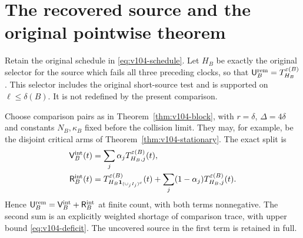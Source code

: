 \section{The recovered source and the original pointwise theorem}
\label{sec:v104-scalar}
Retain the original schedule in \eqref{eq:v104-schedule}. Let
$H_B$ be exactly the original selector for the source which fails
all three preceding clocks, so that
$\mathsf U_B^{\rm rem}=T_{H_B}^{\varepsilon(B)}$. This selector
includes the original short-source test and is supported on
$\ell\le\delta(B)$. It is not redefined by the present comparison.

Choose comparison pairs as in Theorem~\ref{thm:v104-block}, with
$r=\delta$, $\Delta=4\delta$ and constants $N_B,\kappa_B$ fixed
before the collision limit. They may, for example, be the disjoint
critical arms of Theorem~\ref{thm:v104-stationary}. The exact split is
\begin{align}
 \mathsf V_B^{\rm int}(t)
     &=\sum_j\alpha_jT_{H_B,j}^{\varepsilon(B)}(t),\notag\\
 \mathsf R_B^{\rm int}(t)
     &=T_{H_B\one_{(\cup_jI_j)^c}}^{\varepsilon(B)}(t)
                  +\sum_j(1-\alpha_j)T_{H_B,j}^{\varepsilon(B)}(t).
                                                   \label{eq:v104-source-split}
\end{align}
Hence $\mathsf U_B^{\rm rem}=\mathsf V_B^{\rm int}+
\mathsf R_B^{\rm int}$ at finite count, with both terms nonnegative.
The second sum is an explicitly weighted shortage of comparison
trace, with upper bound \eqref{eq:v104-deficit}. The uncovered source
in the first term is retained in full.

